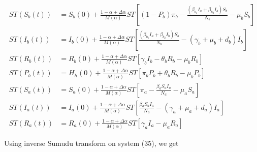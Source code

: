\documentclass[10pt]{NSP1}
\begin{document}
\begin{equation}
\begin{aligned}
ST\left( S_{b}(t) \right) &= S_{b}(0) + \frac{1 - \alpha + \Delta\alpha}{M(\alpha)}ST\left\lbrack \left( 1 - P_{b} \right)\pi_{b} - \frac{\left( \beta_{b_{1}}I_{a} + \beta_{b_{2}}I_{b} \right)S_{b}}{N_{b}} - \mu_{b}S_{b} \right\rbrack \\
ST\left( I_{b}(t) \right) &= I_{b}(0) + \frac{1 - \alpha + \Delta\alpha}{M(\alpha)}ST\left\lbrack \frac{\left( \beta_{b_{1}}I_{a} + \beta_{b_{2}}I_{b} \right)S_{b}}{N_{b}} - \left( \gamma_{b} + \mu_{b} + d_{b} \right)I_{b} \right\rbrack \\
ST\left( R_{b}(t) \right) &= R_{b}(0) + \frac{1 - \alpha + \Delta\alpha}{M(\alpha)}ST\left\lbrack \gamma_{b}I_{b} - \theta_{b}R_{b} - \mu_{b}R_{b} \right\rbrack \\
ST\left( P_{b}(t) \right) &= H_{h}(0) + \frac{1 - \alpha + \Delta\alpha}{M(\alpha)}ST\left\lbrack \pi_{b}P_{b} + \theta_{b}R_{b} - \mu_{b}P_{b} \right\rbrack \\
ST\left( S_{a}(t) \right) &= S_{a}(0) + \frac{1 - \alpha + \Delta\alpha}{M(\alpha)}ST\left\lbrack \pi_{a} - \frac{\beta_{a}S_{a}I_{a}}{N_{a}} - \mu_{a}S_{a} \right\rbrack \\
ST\left( I_{a}(t) \right) &= I_{a}(0) + \frac{1 - \alpha + \Delta\alpha}{M(\alpha)}ST\left\lbrack \frac{\beta_{a}S_{a}I_{a}}{N_{a}} - \left( \gamma_{a} + \mu_{a} + d_{a} \right)I_{a} \right\rbrack \\
ST\left( R_{a}(t) \right) &= R_{a}(0) + \frac{1 - \alpha + \Delta\alpha}{M(\alpha)}ST\left\lbrack \gamma_{a}I_{a} - \mu_{a}R_{a} \right\rbrack
\end{aligned}
\end{equation}



Using inverse Sumudu transform on system (35), we get
\end{document}
